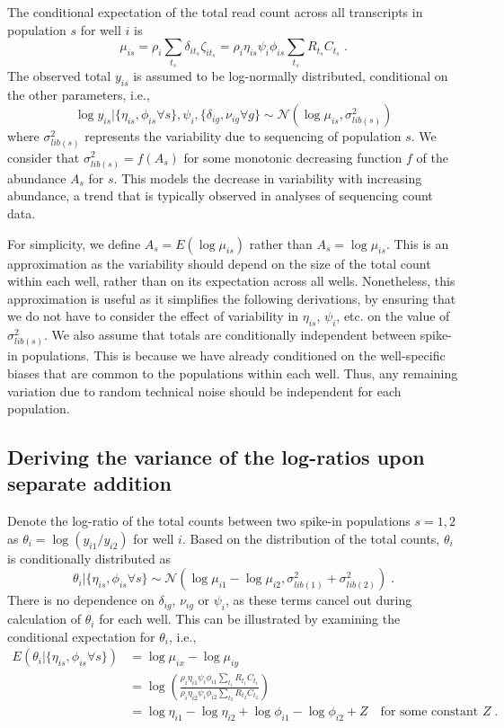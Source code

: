 \documentclass{article}
\begin{document}
The conditional expectation of the total read count across all transcripts in population $s$ for well $i$ is
\[
    \mu_{is} = \rho_i  \textstyle\sum_{t_s} \delta_{it_s} \zeta_{it_s} = \rho_i  \eta_{is} \psi_i \phi_{is} \sum_{t_s} R_{t_s} C_{t_s} \;.
\]
The observed total $y_{is}$ is assumed to be log-normally distributed, conditional on the other parameters, i.e., 
\[
    \log y_{is} | \{ \eta_{is}, \phi_{is} \forall s \}, \psi_i, \{ \delta_{ig}, \nu_{ig} \forall g \} \sim \mathcal{N}(\log \mu_{is}, \sigma^2_{lib(s)})
\]
where $\sigma^2_{lib(s)}$ represents the variability due to sequencing of population $s$.
We consider that $\sigma^2_{lib(s)} = f(A_s)$ for some monotonic decreasing function $f$ of the abundance $A_s$ for $s$.
This models the decrease in variability with increasing abundance, a trend that is typically observed in analyses of sequencing count data.

For simplicity, we define $A_s = E(\log \mu_{is})$ rather than $A_s = \log \mu_{is}$.
This is an approximation as the variability should depend on the size of the total count within each well, rather than on its expectation across all wells.
Nonetheless, this approximation is useful as it simplifies the following derivations, by ensuring that we do not have to consider the effect of variability in $\eta_{is}$, $\psi_i$, etc. on the value of $\sigma^2_{lib(s)}$.
We also assume that totals are conditionally independent between spike-in populations.
This is because we have already conditioned on the well-specific biases that are common to the populations within each well.
Thus, any remaining variation due to random technical noise should be independent for each population.

\subsection{Deriving the variance of the log-ratios upon separate addition}
Denote the log-ratio of the total counts between two spike-in populations $s=1, 2$ as $\theta_i = \log(y_{i1}/y_{i2})$ for well $i$.
Based on the distribution of the total counts, $\theta_i$ is conditionally distributed as
\[
    \theta_i |  \{ \eta_{is}, \phi_{is} \forall s \} \sim \mathcal{N}( \log \mu_{i1} - \log \mu_{i2}, \sigma^2_{lib(1)} + \sigma^2_{lib(2)} ) \;. 
\]
There is no dependence on $\delta_{ig}$, $\nu_{ig}$ or $\psi_i$, as these terms cancel out during calculation of $\theta_i$ for each well.
This can be illustrated by examining the conditional expectation for $\theta_i$, i.e.,
\begin{align*}
    E(\theta_i |  \{ \eta_{is}, \phi_{is} \forall s \})
    &= \log \mu_{ix} - \log \mu_{iy} \\
    &= \log \left( \frac{\rho_i \eta_{i1} \psi_i \phi_{i1} \sum_{t_1} R_{t_1} C_{t_1}}{\rho_i \eta_{i2} \psi_i \phi_{i2} \sum_{t_2} R_{t_2} C_{t_2}} \right) \\
    &= \log \eta_{i1} - \log \eta_{i2} +  \log \phi_{i1} - \log \phi_{i2} + Z \quad\mbox{for some constant } Z \;.
\end{align*}
\end{document}
